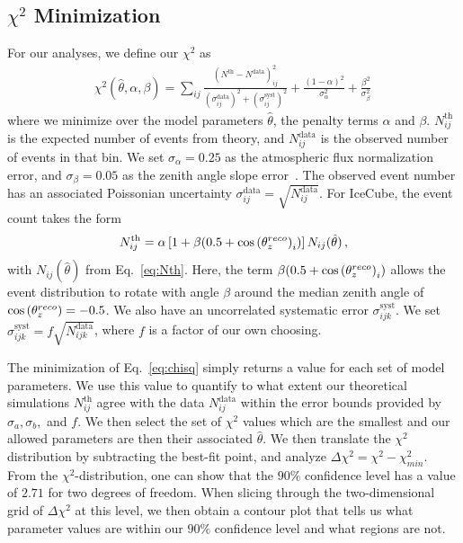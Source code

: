 \subsection{\texorpdfstring{$\chi^2$}{Chi-squared} Minimization}
For our analyses, we define our $\chi^2$ as
\begin{align} \label{eq:chisq}
    \chi^{2}(\hat{\theta},\alpha,\beta)=\sum_{ij} \frac{\left(N^\text{th}-N^\text{data}\right)_{ij}^{2}}
    {\left(\sigma^\text{data}_{ij}\right)^{2} + \left(\sigma^\text{syst}_{ij}\right)^{2}}+ 
    \frac{(1-\alpha)^2}{\sigma_\alpha^2} + \frac{\beta^2}{\sigma_\beta^2}\,
\end{align}
where we minimize over the model parameters $\hat{\theta}$, the penalty terms $\alpha$ and $\beta$.
$N_{ij}^\text{th}$ is the expected number of events from theory, and $N_{ij}^\text{data}$ is the observed number of events in that bin. 
We set $\sigma_\alpha = 0.25$ as the atmospheric flux normalization error, and $\sigma_\beta = 0.05$ as the zenith angle slope error~\cite{hondapaper}. 
The observed event number has an associated Poissonian uncertainty $\sigma_{ij}^\text{data} = \sqrt{N_{ij}^\text{data}}$.
For IceCube, the event count takes the form
\begin{align}
    N^\text{th}_{ij} = \alpha\left[1+\beta (0.5 + \cos{(\theta_z^{reco})}_i )\right] N_{ij}(\hat{\theta})\,,
\end{align}
with $N_{ij}(\hat{\theta})$ from Eq.~\ref{eq:Nth}. Here, the term $ \beta (0.5 + \cos{(\theta_z^{reco})}_i )$ allows the event distribution to rotate with angle $\beta$ around the median zenith angle of $\cos{(\theta_z^{reco})} = -0.5$.
We also have an uncorrelated systematic error $\sigma_{ijk}^\text{syst}$. We set $\sigma_{ijk}^\text{syst} = f\sqrt{N_{ijk}^\text{data}}$, where $f$ is a factor of our own choosing.

The minimization of Eq.~\ref{eq:chisq} simply returns a value for each set of model parameters. We use this value to quantify to what extent
our theoretical simulations $N^\text{th}_{ij}$ agree with the data $N^\text{data}_{ij}$ within the error bounds provided by $\sigma_a,\sigma_b,$ and $f$.
We then select the set of $\chi^2$ values which are the smallest and our allowed parameters are then their associated $\hat{\theta}$.
We then translate the $\chi^2$ distribution by subtracting the best-fit point, and analyze $\Delta \chi^2 = \chi^2 - \chi^2_{min}$.
From the $\chi^2$-distribution, one can show that the $90\%$ confidence level has a value of $2.71$ for two degrees of freedom. When slicing through the 
two-dimensional grid of $\Delta \chi^2$ at this level, we then obtain a contour plot that tells us what parameter values are within our $90 \%$ confidence level and what regions are not.


